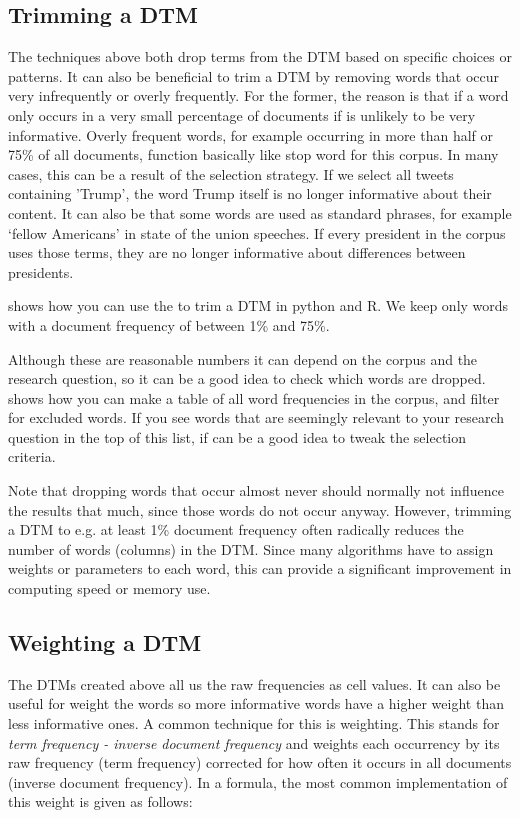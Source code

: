 \subsection{Trimming a DTM}

The techniques above both drop terms from the DTM based on specific choices or patterns.
It can also be beneficial to trim a DTM by removing words that occur very infrequently or overly frequently.
For the former, the reason is that if a word only occurs in a very small percentage of documents if is unlikely to be very informative.
Overly frequent words, for example occurring in more than half or 75\% of all documents, function basically like stop word for this corpus.
In many cases, this can be a result of the selection strategy. If we select all tweets containing 'Trump', the word Trump itself is no longer informative about their content.
It can also be that some words are used as standard phrases, for example `fellow Americans' in state of the union speeches.
If every president in the corpus uses those terms, they are no longer informative about differences between presidents.

 shows how you can use the  to trim a DTM in python and R.
We keep only words with a document frequency of between 1\% and 75\%.

Although these are reasonable numbers it can depend on the corpus and the research question, so it can be a good idea to check which words are dropped.
 shows how you can make a table of all word frequencies in the corpus, and filter for excluded words.
If you see words that are seemingly relevant to your research question in the top of this list,
if can be a good idea to tweak the selection criteria. 

Note that dropping words that occur almost never should normally not influence the results that much, since those words do not occur anyway.
However, trimming a DTM to e.g. at least 1\% document frequency often radically reduces the number of words (columns) in the DTM.
Since many algorithms have to assign weights or parameters to each word, this can provide a significant improvement in computing speed or memory use. 

\subsection{Weighting a DTM}

The DTMs created above all us the raw frequencies as cell values.
It can also be useful for weight the words so more informative words have a higher weight than less informative ones.
A common technique for this is  weighting.
This stands for \emph{term frequency - inverse document frequency} and weights each occurrency by its raw frequency (term frequency) corrected for how often it occurs in all documents (inverse document frequency). In a formula, the most common implementation of this weight is given as follows:

